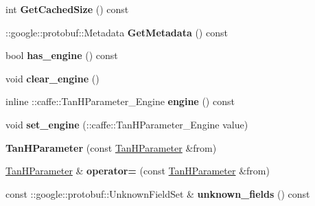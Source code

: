 \begin{DoxyCompactItemize}
int {\bfseries Get\+Cached\+Size} () const
\item 
\mbox{\label{classcaffe_1_1_tan_h_parameter_ab32f966725cb5832e51dcb44509a3f1f}} 
\+::google\+::protobuf\+::\+Metadata {\bfseries Get\+Metadata} () const
\item 
\mbox{\label{classcaffe_1_1_tan_h_parameter_ad18036973ee7721d90dd80f4fe047714}} 
bool {\bfseries has\+\_\+engine} () const
\item 
\mbox{\label{classcaffe_1_1_tan_h_parameter_a67458ee62377a7a8fb4e100da5e6da2b}} 
void {\bfseries clear\+\_\+engine} ()
\item 
\mbox{\label{classcaffe_1_1_tan_h_parameter_a2b410b8b823484f96a8ebf51e492d905}} 
inline \+::caffe\+::\+Tan\+H\+Parameter\+\_\+\+Engine {\bfseries engine} () const
\item 
\mbox{\label{classcaffe_1_1_tan_h_parameter_ab068dcb706690a41483c7b6632cd4db4}} 
void {\bfseries set\+\_\+engine} (\+::caffe\+::\+Tan\+H\+Parameter\+\_\+\+Engine value)
\item 
\mbox{\label{classcaffe_1_1_tan_h_parameter_aeef266a9d05df91f0a0f78c67f07ece5}} 
{\bfseries Tan\+H\+Parameter} (const \mbox{\hyperlink{classcaffe_1_1_tan_h_parameter}{Tan\+H\+Parameter}} \&from)
\item 
\mbox{\label{classcaffe_1_1_tan_h_parameter_a26cc779b72eedb127beb614e18e68f9b}} 
\mbox{\hyperlink{classcaffe_1_1_tan_h_parameter}{Tan\+H\+Parameter}} \& {\bfseries operator=} (const \mbox{\hyperlink{classcaffe_1_1_tan_h_parameter}{Tan\+H\+Parameter}} \&from)
\item 
\mbox{\label{classcaffe_1_1_tan_h_parameter_aeb8654d5d1fe6ef23cb032480d7891fb}} 
const \+::google\+::protobuf\+::\+Unknown\+Field\+Set \& {\bfseries unknown\+\_\+fields} () const
\item 
\mbox{\label{classcaffe_1_1_tan_h_parameter_a8a97507944aa4733d64a876bc9622263}} 

\end{DoxyCompactItemize}
